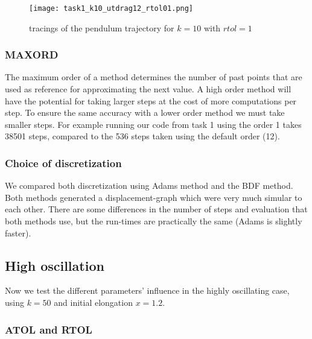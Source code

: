 \documentclass[a4paper,11pt]{article}
\theoremstyle{mytheor}
\begin{document}
\begin{figure}[!h]
\centering
\texttt{[image: task1\_k10\_utdrag12\_rtol01.png]}
\caption{tracings of the pendulum trajectory for $k = 10$ with $rtol = 1$}
\label{3k10rt01}
\end{figure}

\subsubsection*{MAXORD}
The maximum order of a method determines the number of past points that are used as reference for approximating the next value. A high order method will have the potential for taking larger steps at the cost of more computations per step. To ensure the same accuracy with a lower order method we must take smaller steps. For example running our code from task 1 using the order 1 takes 38501 steps, compared to the 536 steps taken using the default order (12).

\subsubsection*{Choice of discretization}
We compared both discretization using Adams method and the BDF method. Both methods generated a displacement-graph which were very much simular to each other. There are some differences in the number of steps and evaluation that both methods use, but the run-times are practically the same (Adams is slightly faster).

\subsection*{High oscillation}
Now  we test the different parameters' influence in the highly oscillating case, using $k = 50$ and initial elongation $x = 1.2$.

\subsubsection*{ATOL and RTOL}

\end{document}
